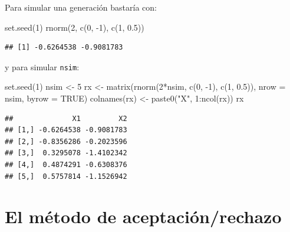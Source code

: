 \documentclass[
]{book}
\newenvironment{Shaded}{\begin{snugshade}}{\end{snugshade}}
\newcommand{\AttributeTok}[1]{\textcolor[rgb]{0.77,0.63,0.00}{#1}}
\newcommand{\ConstantTok}[1]{\textcolor[rgb]{0.00,0.00,0.00}{#1}}
\newcommand{\DecValTok}[1]{\textcolor[rgb]{0.00,0.00,0.81}{#1}}
\newcommand{\FloatTok}[1]{\textcolor[rgb]{0.00,0.00,0.81}{#1}}
\newcommand{\FunctionTok}[1]{\textcolor[rgb]{0.00,0.00,0.00}{#1}}
\newcommand{\NormalTok}[1]{#1}
\newcommand{\OtherTok}[1]{\textcolor[rgb]{0.56,0.35,0.01}{#1}}
\newcommand{\SpecialCharTok}[1]{\textcolor[rgb]{0.00,0.00,0.00}{#1}}
\newcommand{\StringTok}[1]{\textcolor[rgb]{0.31,0.60,0.02}{#1}}
\theoremstyle{break}
\theoremstyle{nonumberplain}
\begin{document}
Para simular una generación bastaría con:

\begin{Shaded}
\begin{Highlighting}[]
\FunctionTok{set.seed}\NormalTok{(}\DecValTok{1}\NormalTok{)}
\FunctionTok{rnorm}\NormalTok{(}\DecValTok{2}\NormalTok{, }\FunctionTok{c}\NormalTok{(}\DecValTok{0}\NormalTok{, }\SpecialCharTok{{-}}\DecValTok{1}\NormalTok{), }\FunctionTok{c}\NormalTok{(}\DecValTok{1}\NormalTok{, }\FloatTok{0.5}\NormalTok{))}
\end{Highlighting}
\end{Shaded}

\begin{verbatim}
## [1] -0.6264538 -0.9081783
\end{verbatim}

y para simular \texttt{nsim}:

\begin{Shaded}
\begin{Highlighting}[]
\FunctionTok{set.seed}\NormalTok{(}\DecValTok{1}\NormalTok{)}
\NormalTok{nsim }\OtherTok{\textless{}{-}} \DecValTok{5}
\NormalTok{rx }\OtherTok{\textless{}{-}} \FunctionTok{matrix}\NormalTok{(}\FunctionTok{rnorm}\NormalTok{(}\DecValTok{2}\SpecialCharTok{*}\NormalTok{nsim, }\FunctionTok{c}\NormalTok{(}\DecValTok{0}\NormalTok{, }\SpecialCharTok{{-}}\DecValTok{1}\NormalTok{), }\FunctionTok{c}\NormalTok{(}\DecValTok{1}\NormalTok{, }\FloatTok{0.5}\NormalTok{)), }\AttributeTok{nrow =}\NormalTok{ nsim, }\AttributeTok{byrow =} \ConstantTok{TRUE}\NormalTok{)}
\FunctionTok{colnames}\NormalTok{(rx) }\OtherTok{\textless{}{-}} \FunctionTok{paste0}\NormalTok{(}\StringTok{"X"}\NormalTok{, }\DecValTok{1}\SpecialCharTok{:}\FunctionTok{ncol}\NormalTok{(rx))}
\NormalTok{rx}
\end{Highlighting}
\end{Shaded}

\begin{verbatim}
##              X1         X2
## [1,] -0.6264538 -0.9081783
## [2,] -0.8356286 -0.2023596
## [3,]  0.3295078 -1.4102342
## [4,]  0.4874291 -0.6308376
## [5,]  0.5757814 -1.1526942
\end{verbatim}

\hypertarget{el-muxe9todo-de-aceptaciuxf3nrechazo}{%
\section{El método de aceptación/rechazo}\label{el-muxe9todo-de-aceptaciuxf3nrechazo}}
\end{document}
